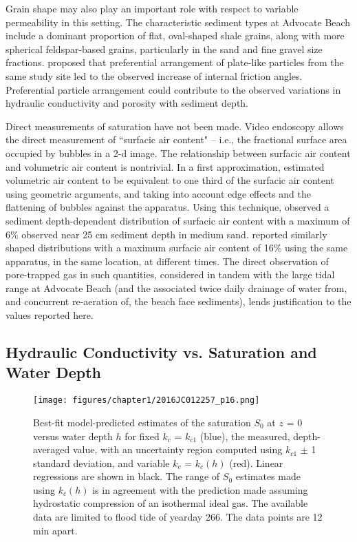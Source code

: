 Grain shape may also play an important role with respect to variable permeability in this setting. The characteristic sediment types at Advocate Beach include a dominant proportion of flat, oval-shaped shale grains, along with more spherical feldspar-based grains, particularly in the sand and fine gravel size fractions. \citet{Stark_etal2014} proposed that preferential arrangement of plate-like particles from the same study site led to the observed increase of internal friction angles. Preferential particle arrangement could contribute to the observed variations in hydraulic conductivity and porosity with sediment depth.

Direct measurements of saturation have not been made. Video endoscopy allows the direct measurement of ``surfacic air content" -- i.e., the fractional surface area occupied by bubbles in a 2-d image. The relationship between surfacic air content and volumetric air content is nontrivial. In a first approximation, \citet{Breul_Gourves2008} estimated volumetric air content to be equivalent to one third of the surfacic air content using geometric arguments, and taking into account edge effects and the flattening of bubbles against the apparatus. Using this technique, \citet{Bonjean_etal2004} observed a sediment depth-dependent distribution of surfacic air content with a maximum of 6\% observed near 25 cm sediment depth in medium sand. \citet{Breul_Gourves2008} reported similarly shaped distributions with a maximum surfacic air content of 16\% using the same apparatus, in the same location, at different times. The direct observation of pore-trapped gas in such quantities, considered in tandem with the large tidal range at Advocate Beach (and the associated twice daily drainage of water from, and concurrent re-aeration of, the beach face sediments), lends justification to the values reported here.


\subsection{Hydraulic Conductivity vs. Saturation and Water Depth}\label{dsdh}

\begin{figure} %
		\begin{center}	
		\noindent\texttt{[image: figures/chapter1/2016JC012257\_p16.png]}
	\caption[Best-fit saturation values: variable hydraulic conductivity]{Best-fit model-predicted estimates of the saturation $S_0$ at $z$ = 0 versus water depth $h$ for fixed $k_c$ = $k_{c1}$ (blue), the measured, depth-averaged value, with an uncertainty region computed using $k_{c1}$ $\pm$ 1 standard deviation, and variable $k_c$ = $k_{c}(h)$ (red). Linear regressions are shown in black. The range of $S_0$ estimates made using $k_c(h)$ is in agreement with the prediction made assuming hydrostatic compression of an isothermal ideal gas. The available data are limited to flood tide of yearday 266. The data points are 12 min apart.} 
	\label{fig:S3}
		\end{center}
\end{figure}


